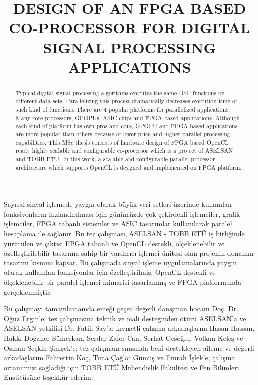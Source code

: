 \documentclass{etutez}
\title{DESIGN OF AN FPGA BASED CO-PROCESSOR FOR DIGITAL SIGNAL PROCESSING APPLICATIONS}
\institute{Institute of Natural and Applied Sciences}
\begin{document}
\titlepageMS   %
\signaturepageMS  %
\tezbildirimsayfasi    %


\begin{ozet}
	Sayısal sinyal işlemede yaygın olarak büyük veri setleri üzerinde kullanılan fonksiyonların hızlandırılması için günümüzde çok çekirdekli işlemciler, grafik işlemciler, FPGA tabanlı sistemler ve ASIC tasarımlar kullanılarak paralel hesaplama ile sağlanır. Bu tez çalışması, ASELSAN - TOBB ETÜ iş birliğinde yürütülen ve çıktısı FPGA tabanlı ve OpenCL destekli, ölçeklenebilir ve özelleştirilebilir tasarıma sahip bir yardımcı işlemci ünitesi olan projenin donanım tasarımı kısmını kapsar. Bu çalışmada sinyal işleme uygulamalarında yaygın olarak kullanılan fonksiyonlar için özelleştirilmiş, OpenCL destekli ve ölçeklenebilir bir paralel işlemci mimarisi tasarlanmış ve FPGA platformunda gerçeklenmiştir.
\end{ozet}



\begin{abstract}
	Typical digital signal processing algorithms executes the same DSP functions on different data sets. Parallelizing this process dramatically decreases execution time of such kind of functions. There are 4 popular platforms for parallelized applications: Many-core processors, GPGPUs, ASIC chips and FPGA based applications. Although each kind of platform has own pros and cons, GPGPU and FPGA based applications are more popular than others because of lower price and higher parallel processing capabilities. This MSc thesis consists of hardware design of FPGA based OpenCL ready highly scalable and configurable co-processor which is a project of ASELSAN and TOBB ETÜ. In this work, a scalable and configurable parallel processor architecture which supports OpenCL is designed and implemented on FPGA platform.  
\end{abstract}


\begin{tesekkur}
 Bu çalışmayı tamamlamamda emeği geçen değerli danışman hocam Doç. Dr. Oğuz Ergin'e; tez çalışmasına teknik ve mali desteğinden ötürü ASELSAN'a ve ASELSAN yetkilisi Dr. Fatih Say'a; kıymetli çalışma arkadaşlarım Hasan Hassan, Hakkı Doğaner Sümerkan, Serdar Zafer Can, Serhat Gesoğlu, Volkan Keleş ve Osman Seçkin Şimşek'e; tez çalışmam sırasında beni destekleyen aileme ve değerli arkadaşlarım Fahrettin Koç, Tuna Çağlar Gümüş ve Emrah İşlek'e; çalışma ortamımızı sağladığı için TOBB ETÜ Mühendislik Fakültesi ve Fen Bilimleri Enstitüsüne teşekkür ederim.
\end{tesekkur}



\pagestyle{plain}




\makeatother
\end{document}
